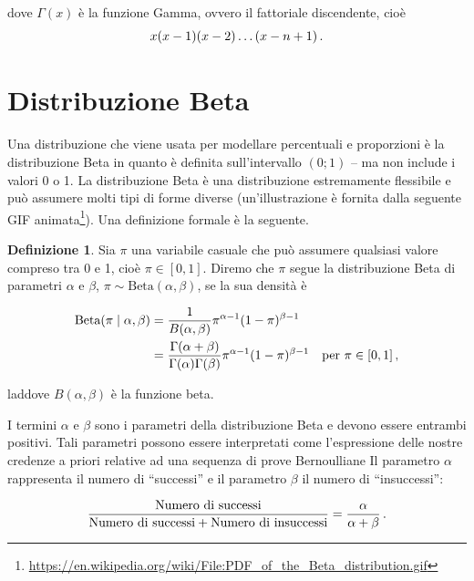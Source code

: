 \documentclass[
  11pt,
]{krantz}
\renewcommand{\href}[2]{#2\footnote{\url{#1}}}
\theoremstyle{definition}
\newtheorem{definition}{Definizione}[chapter]
\theoremstyle{definition}
\theoremstyle{definition}
\theoremstyle{definition}
\theoremstyle{remark}
\begin{document}
dove \(\Gamma(x)\) è la funzione Gamma, ovvero il fattoriale discendente, cioè \begin{equation}
x(x-1)(x-2)\ldots (x-n+1)\notag\,.
\end{equation}

\hypertarget{distribuzione-beta}{%
\section{Distribuzione Beta}\label{distribuzione-beta}}

Una distribuzione che viene usata per modellare percentuali e proporzioni è la distribuzione Beta in quanto è definita sull'intervallo \((0; 1)\) -- ma non include i valori 0 o 1. La distribuzione Beta è una distribuzione estremamente flessibile e può assumere molti tipi di forme diverse (un'illustrazione è fornita dalla seguente \href{https://en.wikipedia.org/wiki/File:PDF_of_the_Beta_distribution.gif}{GIF animata}). Una definizione formale è la seguente.

\begin{definition}
Sia \(\pi\) una variabile casuale che può assumere qualsiasi valore compreso tra 0 e 1, cioè \(\pi \in [0, 1]\). Diremo che \(\pi\) segue la distribuzione Beta di parametri \(\alpha\) e \(\beta\), \(\pi \sim \text{Beta}(\alpha, \beta)\), se la sua densità è

\begin{align}
\text{Beta}(\pi \mid \alpha, \beta) &= \frac{1}{B(\alpha, \beta)}\pi^{\alpha-1} (1-\pi)^{\beta-1}\notag\\ 
&=  \frac{\Gamma(\alpha+ \beta)}{\Gamma(\alpha)\Gamma(\beta)}\pi^{\alpha-1} (1-\pi)^{\beta-1} \quad \text{per } \pi \in [0, 1]\,,
\label{eq:beta-distr-formula}
\end{align}

laddove \(B(\alpha, \beta)\) è la funzione beta.
\end{definition}

I termini \(\alpha\) e \(\beta\) sono i parametri della distribuzione Beta e devono essere entrambi positivi. Tali parametri possono essere interpretati come l'espressione delle nostre credenze a priori relative ad una sequenza di prove Bernoulliane Il parametro \(\alpha\) rappresenta il numero di ``successi'' e il parametro \(\beta\) il numero di ``insuccessi'':

\begin{equation}
\frac{\text{Numero di successi}}{\text{Numero di successi} + \text{Numero di insuccessi}} = \frac{\alpha}{\alpha + \beta}\notag\,.
\end{equation}
\end{document}
